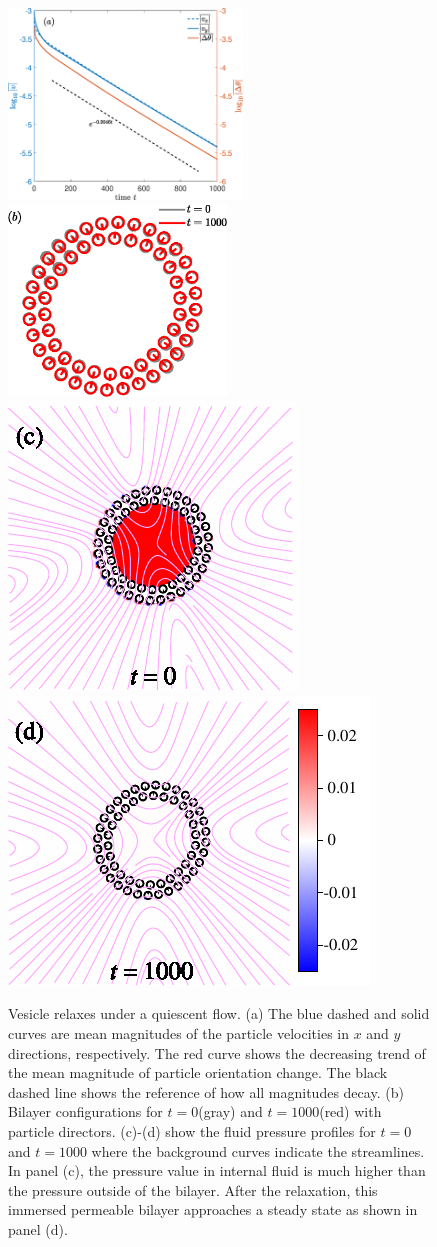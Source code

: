 \documentclass[lineno]{jfm}
\begin{document}
\begin{figure}
\centering
\includegraphics[height=2in]{relax.eps}
\includegraphics[height=2in]{relax2.eps}\\
\includegraphics[height=2.in]{N58_0pres.pdf}
\includegraphics[height=2.in]{N58_5000pres.pdf}
  \caption{Vesicle relaxes under a quiescent flow. (a) The blue dashed and solid curves are mean magnitudes of the particle velocities in $x$ and $y$ directions, respectively. The red curve shows the decreasing trend of the mean magnitude of particle orientation change. The black dashed line shows the reference of how all magnitudes decay. (b) Bilayer configurations for $t=0$(gray) and $t=1000$(red) with particle directors.
  (c)-(d) show the fluid pressure profiles for $t=0$ and $t=1000$ where the background curves indicate the streamlines. In panel (c), the pressure value in internal fluid is much higher than the pressure outside of the bilayer. After the relaxation, this immersed permeable bilayer approaches a steady state as shown in panel (d).
  }
    \label{figure2}
\end{figure}
\end{document}
